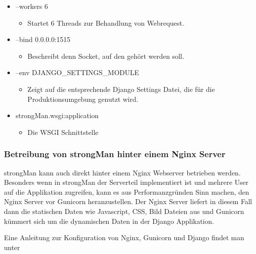 \begin{itemize}
    \item --workers 6
    \begin{itemize}
        \item Startet 6 Threads zur Behandlung von Webrequest.
    \end{itemize}
    \item --bind 0.0.0.0:1515
    \begin{itemize}
        \item Beschreibt denn Socket, auf den gehört werden soll.
    \end{itemize}
    \item --env DJANGO\_SETTINGS\_MODULE
    \begin{itemize}
        \item Zeigt auf die entsprechende Django Settings Datei, die für die Produktionsumgebung genutzt wird.
    \end{itemize}
    \item strongMan.wsgi:application
    \begin{itemize}
        \item Die WSGI Schnittstelle
    \end{itemize}
\end{itemize}


\subsubsection{Betreibung von strongMan hinter einem Nginx Server}
strongMan kann auch direkt hinter einem Nginx Webserver betrieben werden. Besonders wenn in strongMan der Serverteil implementiert ist und mehrere User auf die Applikation zugreifen, kann es aus Performanzgründen Sinn machen, den Nginx Server vor Gunicorn heranzustellen. Der Nginx Server liefert in diesem Fall dann die statischen Daten wie Javascript, CSS, Bild Dateien aus und Gunicorn kümmert sich um die dynamischen Daten in der Django Applikation.

Eine Anleitung zur Konfiguration von Nginx, Gunicorn und Django findet man unter \cite{nginx-gunicorn}



